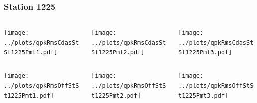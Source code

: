 \documentclass[aspectratio=169]{beamer}
\begin{document}
\begin{frame} 
  \frametitle{Station 1225}
  \begin{center}
    \begin{columns}
      \begin{column}{0.33\textwidth}
        \texttt{[image: ../plots/qpkRmsCdasStSt1225Pmt1.pdf]}
      \end{column}
      \begin{column}{0.33\textwidth}
        \texttt{[image: ../plots/qpkRmsCdasStSt1225Pmt2.pdf]}
      \end{column}
      \begin{column}{0.33\textwidth}
        \texttt{[image: ../plots/qpkRmsCdasStSt1225Pmt3.pdf]}
      \end{column}
    \end{columns}
  \end{center}

  \begin{center}
    \begin{columns}
      \begin{column}{0.33\textwidth}
        \texttt{[image: ../plots/qpkRmsOffStSt1225Pmt1.pdf]}
      \end{column}
      \begin{column}{0.33\textwidth}
        \texttt{[image: ../plots/qpkRmsOffStSt1225Pmt2.pdf]}
      \end{column}
      \begin{column}{0.33\textwidth}
        \texttt{[image: ../plots/qpkRmsOffStSt1225Pmt3.pdf]}
      \end{column}
    \end{columns}
  \end{center}
\end{frame}
\end{document}
